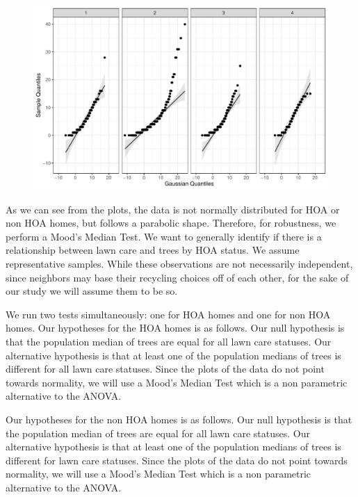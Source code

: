 \documentclass{article}
\begin{document}
	\begin{figure}[H]
		\centering
\includegraphics{exam23-040}
		\label{Fig:plot17}
	\end{figure}
As we can see from the plots\citep{qqplotr}, the data is not normally distributed for HOA or non HOA homes, but follows a parabolic shape. Therefore, for robustness, we perform a Mood's Median Test\citep{RVAideMemoire}. We want to generally identify if there is a relationship between lawn care and trees by HOA status. We assume representative samples. While these observations are not necessarily independent, since neighbors may base their recycling choices off of each other, for the sake of our study we will assume them to be so.

We run two tests simultaneously: one for HOA homes and one for non HOA homes.
Our hypotheses for the HOA homes is as follows. Our null hypothesis is that the population median of trees are equal for all lawn care statuses. Our alternative hypothesis is that at least one of the population medians of trees is different for all lawn care statuses. Since the plots of the data do not point towards normality, we will use a Mood's Median Test which is a non parametric alternative to the ANOVA.

Our hypotheses for the non HOA homes is as follows. Our null hypothesis is that the population median of trees are equal for all lawn care statuses. Our alternative hypothesis is that at least one of the population medians of trees is different for lawn care statuses. Since the plots of the data do not point towards normality, we will use a Mood's Median Test which is a non parametric alternative to the ANOVA.
\end{document}
